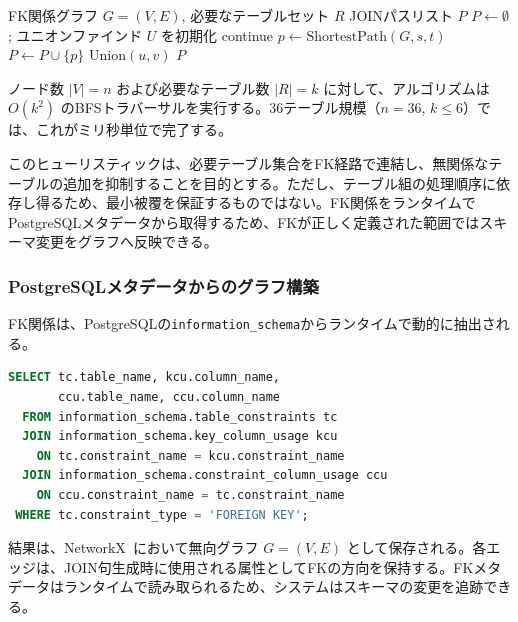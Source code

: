\documentclass[twocolumn]{interact}
\begin{document}
\begin{algorithm}[htbp]
  \caption{必要テーブルを連結する貪欲最短経路JOINヒューリスティック。}
  \label{alg:join_connector}
  \footnotesize
  \begin{algorithmic}[1]
    \Require FK関係グラフ $G = (V, E)$, 必要なテーブルセット $R$
    \Ensure JOINパスリスト $P$
    \State $P \gets \emptyset$; ユニオンファインド $U$ を初期化
        \State continue
      \EndIf
      \State $p \gets \text{ShortestPath}(G, s, t)$ 
        \State $P \gets P \cup \{p\}$
          \State $\text{Union}(u, v)$
        \EndFor
      \EndIf
    \EndFor
    \State \Return $P$
  \end{algorithmic}
\end{algorithm}

ノード数 $|V| = n$ および必要なテーブル数 $|R| = k$ に対して、アルゴリズムは $O(k^2)$ のBFSトラバーサルを実行する。36テーブル規模（$n = 36$, $k \leq 6$）では、これがミリ秒単位で完了する。

このヒューリスティックは、必要テーブル集合をFK経路で連結し、無関係なテーブルの追加を抑制することを目的とする。ただし、テーブル組の処理順序に依存し得るため、最小被覆を保証するものではない。FK関係をランタイムでPostgreSQLメタデータから取得するため、FKが正しく定義された範囲ではスキーマ変更をグラフへ反映できる。

\subsubsection{PostgreSQLメタデータからのグラフ構築}

FK関係は、PostgreSQLの\texttt{information\_schema}からランタイムで動的に抽出される。

\begin{lstlisting}[language=SQL,caption={FK関係の抽出},label=lst:fk_query,numbers=none]
SELECT tc.table_name, kcu.column_name,
       ccu.table_name, ccu.column_name
  FROM information_schema.table_constraints tc
  JOIN information_schema.key_column_usage kcu
    ON tc.constraint_name = kcu.constraint_name
  JOIN information_schema.constraint_column_usage ccu
    ON ccu.constraint_name = tc.constraint_name
 WHERE tc.constraint_type = 'FOREIGN KEY';
\end{lstlisting}

結果は、NetworkX~\cite{networkx2008}において無向グラフ $G = (V, E)$ として保存される。各エッジは、JOIN句生成時に使用される属性としてFKの方向を保持する。FKメタデータはランタイムで読み取られるため、システムはスキーマの変更を追跡できる。
\end{document}
